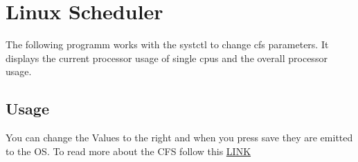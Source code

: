 \documentclass[a4paper, oneside]{scrreprt}
\author{Sebastian Paulsen}
\begin{document}
\chapter{Linux Scheduler}

The following programm works with the systctl to change cfs parameters. It displays the current processor usage of single cpus and the overall processor usage.

\section{Usage}
You can change the Values to the right and when you press save they are emitted to the OS.
To read more about the CFS follow this \href{https://doc.opensuse.org/documentation/leap/tuning/html/book.sle.tuning/cha.tuning.taskscheduler.html}{LINK}
\end{document}
